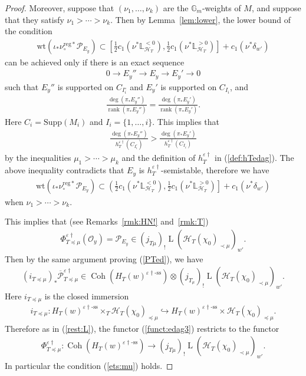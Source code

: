 \documentclass[11pt,oneside,a4paper,mathscr]{amsart}
\theoremstyle{definition}
\newcommand{\LL}{\operatorname{L}}
\newcommand{\cH}{\mathcal{H}}
\newcommand{\cP}{\mathcal{P}}
\newcommand{\rank}{\operatorname{rank}}
\newcommand{\Coh}{\operatorname{Coh}}
\newcommand{\wt}{\mathrm{wt}}
\newcommand{\vd}{\varepsilon\dag}
\begin{document}
\begin{proof}
Moreover, suppose that $(\nu_1, \ldots, \nu_k)$ 
are the $\mathbb{G}_m$-weights of $M$, and suppose that they satisfy $\nu_1>\cdots>\nu_k$. Then by Lemma~\ref{lem:lower},  
the lower bound of the condition 
\begin{align*}
    \wt(\iota_{*}\nu_{\circ}^{\mathrm{reg}*}\mathcal{P}_{E_y}) \subset\left[\frac{1}{2}c_1(\nu^* \mathbb{L}_{\cH_T}^{<0}), \frac{1}{2}c_1(\nu^* \mathbb{L}_{\cH_T}^{>0})  \right]+c_1(\nu^* \delta_{w'})
\end{align*}
can be achieved only if there is an exact sequence 
\begin{align*}
    0\to E_y'' \to E_y \to E_y' \to 0
\end{align*}
such that $E_y''$ is supported on $C_{I_i^{\circ}}$ and $E_y'$ is supported on $C_{I_i}$, and 
\begin{align*}
    \frac{\deg (\pi_{*}E_{y}'')}{\rank (\pi_{*}E_y'')}= \frac{\deg (\pi_{*}E_{y}')}{\rank (\pi_{*}E_y')}.
\end{align*}
Here $C_i=\mathrm{Supp}(M_i)$ and $I_i=\{1, \ldots, i\}$. 
This implies that 
\begin{align*}
     \frac{\deg (\pi_{*}E_{y}'')}{h_T^{\varepsilon\dag}(C_{I_i^{\circ}})}> \frac{\deg (\pi_{*}E_{y}')}{h_T^{\varepsilon\dag}(C_{I_i})}
\end{align*}
by the inequalities $\mu_1>\cdots>\mu_k$ and the definition of $h_T^{\vd}$ in (\ref{def:hTedag}). 
The above inequality contradicts that $E_y$ is $h_T^{\varepsilon\dag}$-semistable,
therefore we have 
\begin{align*}
    \wt(\iota_{*}\nu_{\circ}^{\mathrm{reg}*}\mathcal{P}_{E_y}) \subset\left(\frac{1}{2}c_1(\nu^* \mathbb{L}_{\cH_T}^{<0}), \frac{1}{2}c_1(\nu^* \mathbb{L}_{\cH_T}^{>0})  \right]+c_1(\nu^* \delta_{w'})
\end{align*}
when $\nu_1>\cdots>\nu_k$. 

This implies that (see Remarks~\ref{rmk:HN!} and~\ref{rmk:T})
\begin{align*}
      \Phi_{T\preceq \mu}^{\varepsilon\dag}(\mathcal{O}_y)=\mathcal{P}_{E_y}
      \in  (j_{T\mu})_{!}\LL(\cH_T(\chi_0)_{\prec \mu})_{w'}.
\end{align*}
Then by the same argument proving (\ref{PTed}), we have 
\begin{align*}
    (i_{T\preceq \mu})_{*}\overline{\cP}_{T\preceq \mu}^{\vd} \in 
    \Coh(H_T(w)^{\vd\text{-ss}})\otimes (j_{T_{\mu}})_{!}\LL(\cH_T(\chi_0)_{\prec \mu})_{w'}.
\end{align*}
Here $i_{T\preceq \mu}$ is the closed immersion 
\begin{align*}
  i_{T\preceq \mu} \colon     H_T(w)^{\vd\text{-ss}}\times_T \cH_T(\chi_0)_{\preceq \mu} \hookrightarrow 
H_T(w)^{\vd\text{-ss}}\times \cH_T(\chi_0)_{\preceq \mu}.
\end{align*}
Therefore as in (\ref{rest:L}), 
the functor (\ref{funct:edag3})
restricts to the functor 
\begin{align*}
       \Phi_{T\preceq \mu}^{\varepsilon\dag} \colon \Coh(H_T(w)^{\varepsilon\dag\text{-ss}}) \to 
  (j_{T\mu})_{!} \LL(\cH_T(\chi_0)_{\prec \mu})_{w'}.
   \end{align*}
   In particular 
the condition (\ref{ets:mu}) holds. 
\end{proof}
\end{document}
